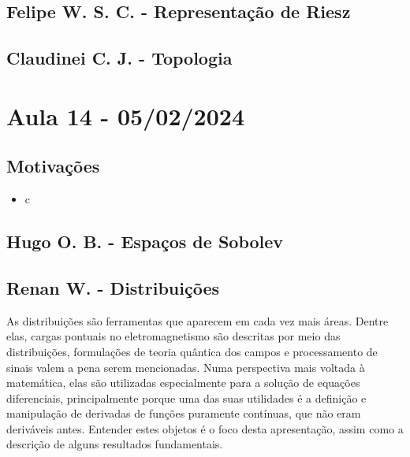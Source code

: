 \documentclass{article}
\begin{document}
\subsection{Felipe W. S. C. - Representação de Riesz}
\subsection{Claudinei C. J. - Topologia}
\newpage 

\section{Aula 14 - 05/02/2024}
\subsection{Motivações} 
 \begin{itemize}
   \item c
 \end{itemize}
\subsection{Hugo O. B. - Espaços de Sobolev}
\subsection{Renan W. - Distribuições}
  As distribuições são ferramentas que aparecem em cada vez mais áreas. Dentre elas, cargas pontuais no eletromagnetismo são descritas por meio das distribuições, 
formulações de teoria quântica dos campos e processamento de sinais valem a pena serem mencionadas. Numa perspectiva mais voltada à matemática, elas são utilizadas especialmente 
para a solução de equações diferenciais, principalmente porque uma das suas utilidades é a definição e manipulação de derivadas de funções puramente contínuas, que não eram deriváveis antes. 
Entender estes objetos é o foco desta apresentação, assim como a descrição de alguns resultados fundamentais. 
\end{document}
